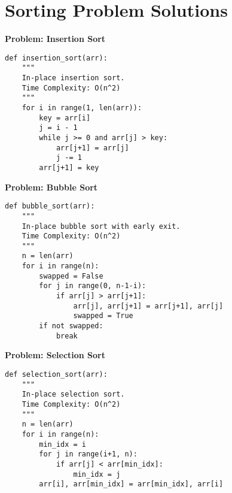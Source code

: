 % 
% 
\section*{Sorting Problem Solutions}
\noindent\textbf{Problem: Insertion Sort}
\begin{verbatim}
def insertion_sort(arr):
    """
    In-place insertion sort.
    Time Complexity: O(n^2)
    """
    for i in range(1, len(arr)):
        key = arr[i]
        j = i - 1
        while j >= 0 and arr[j] > key:
            arr[j+1] = arr[j]
            j -= 1
        arr[j+1] = key
\end{verbatim}

\noindent\textbf{Problem: Bubble Sort}
\begin{verbatim}
def bubble_sort(arr):
    """
    In-place bubble sort with early exit.
    Time Complexity: O(n^2)
    """
    n = len(arr)
    for i in range(n):
        swapped = False
        for j in range(0, n-1-i):
            if arr[j] > arr[j+1]:
                arr[j], arr[j+1] = arr[j+1], arr[j]
                swapped = True
        if not swapped:
            break
\end{verbatim}

\noindent\textbf{Problem: Selection Sort}
\begin{verbatim}
def selection_sort(arr):
    """
    In-place selection sort.
    Time Complexity: O(n^2)
    """
    n = len(arr)
    for i in range(n):
        min_idx = i
        for j in range(i+1, n):
            if arr[j] < arr[min_idx]:
                min_idx = j
        arr[i], arr[min_idx] = arr[min_idx], arr[i]
\end{verbatim}

